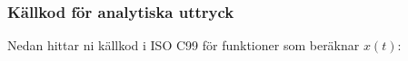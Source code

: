 \subsubsection{Källkod för analytiska uttryck}
Nedan hittar ni källkod i ISO C99 för funktioner som beräknar $x(t)$:

\inputminted[fontsize=\footnotesize]{c}{derivations/analytic.c}
